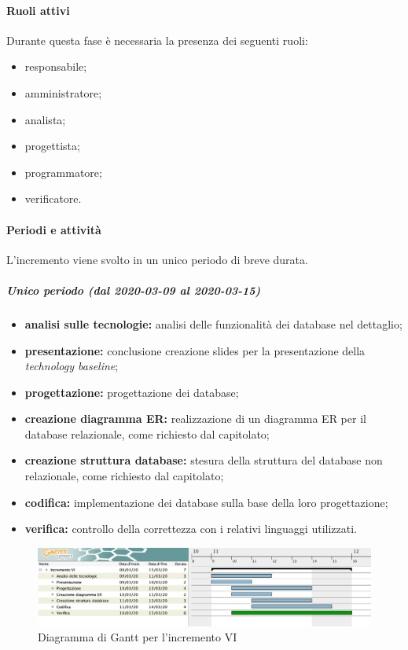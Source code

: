 			\paragraph{Ruoli attivi}
			
				Durante questa fase è necessaria la presenza dei seguenti ruoli:
				\begin{itemize}
					\item responsabile;
					\item amministratore;
					\item analista;
					\item progettista;
					\item programmatore;
					\item verificatore.
				\end{itemize}
			
			\paragraph{Periodi e attività}
			
				L'incremento viene svolto in un unico periodo di breve durata.
				
				\subparagraph{Unico periodo (dal 2020-03-09 al 2020-03-15)}
				
					\begin{itemize}
						\item \textbf{analisi sulle tecnologie:} analisi delle funzionalità dei database nel dettaglio;
						\item \textbf{presentazione:} conclusione creazione slides per la presentazione della \textit{technology baseline};
						\item \textbf{progettazione:} progettazione dei database;
						\item \textbf{creazione diagramma ER:} realizzazione di un diagramma ER per il database relazionale, come richiesto dal capitolato;
						\item \textbf{creazione struttura database:} stesura della struttura del database non relazionale, come richiesto dal capitolato;
						\item \textbf{codifica:} implementazione dei database sulla base della loro progettazione;
						\item \textbf{verifica:} controllo della correttezza con i relativi linguaggi utilizzati.
					\end{itemize} 			

		\begin{landscape}
          \begin{figure}[H]
            \centering
            \includegraphics[width=\linewidth]{images/gantt/incrementoVI} %
            \caption{Diagramma di Gantt per l'incremento VI}
          \end{figure}		
		\end{landscape}

